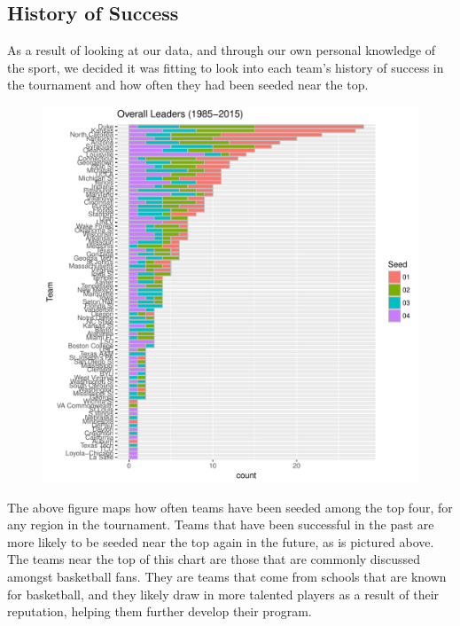 \documentclass[]{scrartcl}
\begin{document}
\subsection*{History of Success}
As a result of looking at our data, and through our own personal knowledge of the sport, we decided it was fitting to look into each team's history of success in the tournament and how often they had been seeded near the top.
\begin{figure}[H]
	\centering
	\includegraphics[scale=.5]{overLeaders.pdf}
\end{figure}
The above figure maps how often teams have been seeded among the top four, for any region in the tournament. Teams that have been successful in the past are more likely to be seeded near the top again in the future, as is pictured above. The teams near the top of this chart are those that are commonly discussed amongst basketball fans. They are teams that come from schools that are known for basketball, and they likely draw in more talented players as a result of their reputation, helping them further develop their program.
\end{document}
